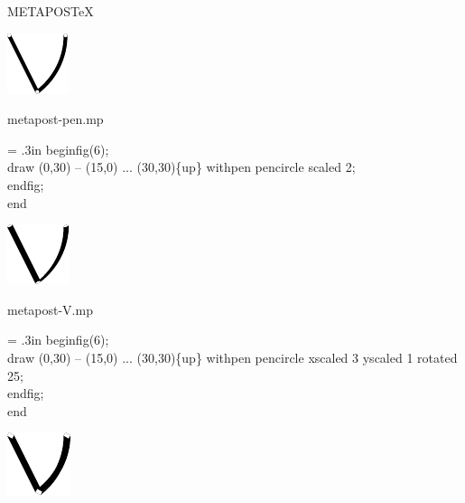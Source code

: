 \documentclass[danish,a2paper,22pt]{scrartcl}
\begin{document}


\begin{center}
\color{White}
{\normalfont\logofamily \Huge METAPOS}\Huge {\TeX}
\vspace{2cm}
\end{center}

\begin{multicols*}{3}
\begin{spacing}{0.5}

\center
\includegraphics[scale=4.5]{metapost-pen/metapost-pen-1.pdf}
\vspace{1cm}

\flushleft
\color{White}
\romansmall
metapost-pen.mp\\
\vspace{.4cm}
\color{Black}
\typewritersmall
{\leftskip = .3in
beginfig(6);\\
draw (0,30) -- (15,0) ... (30,30)\fontsize{15pt}{40pt}\{up\} withpen pencircle scaled 2;\\
endfig;\\
end
\par}
\vspace{2cm}

\center
\includegraphics[scale=4.5]{metapost-pen/metapost-pen-2.pdf}
\vspace{1cm}

\flushleft
\color{White}
\romansmall
metapost-V.mp\\
\vspace{.4cm}
\color{Black}
\typewritersmall
{\leftskip = .3in
beginfig(6);\\
draw (0,30) -- (15,0) ... (30,30)\fontsize{15pt}{40pt}\{up\} withpen pencircle xscaled 3 yscaled 1 rotated 25;\\
endfig;\\
end
\par}
\vspace{2cm}

\center
\includegraphics[scale=4.5]{metapost-pen/metapost-pen-3.pdf}
\vspace{1cm}


\end{spacing}
\end{multicols*}
\end{document}
